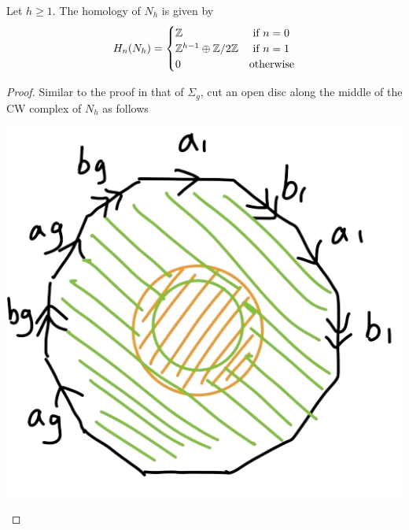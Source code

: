 \documentclass[a4paper]{article}
\begin{document}
\begin{thm}{}{} Let $h\geq 1$. The homology of $N_h$ is given by $$H_n(N_h)=\begin{cases}
\mathbb{Z} & \text{ if } n=0\\
\mathbb{Z}^{h-1}\oplus\mathbb{Z}/2\mathbb{Z} & \text{ if } n=1\\
0 & \text{otherwise}
\end{cases}$$ \tcbline
\begin{proof}
Similar to the proof in that of $\Sigma_g$, cut an open disc along the middle of the CW complex of $N_h$ as follows 

\begin{center}
\includegraphics[scale = 0.3]{Image 5}
\end{center}


\end{proof}
\end{thm}
\end{document}
